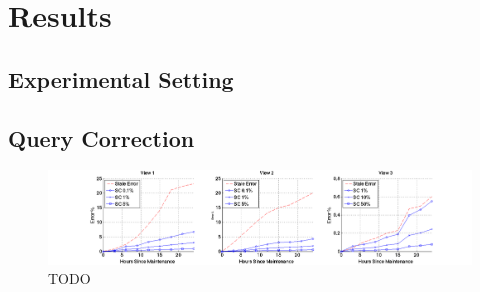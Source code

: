 \section{Results}

\subsection{Experimental Setting}

\subsection{Query Correction}

\begin{figure}[h]
\label{conviva}
\centering
 \includegraphics[width=\textwidth]{exp/exp1-conviva1.png}
 \caption{TODO}
\end{figure}